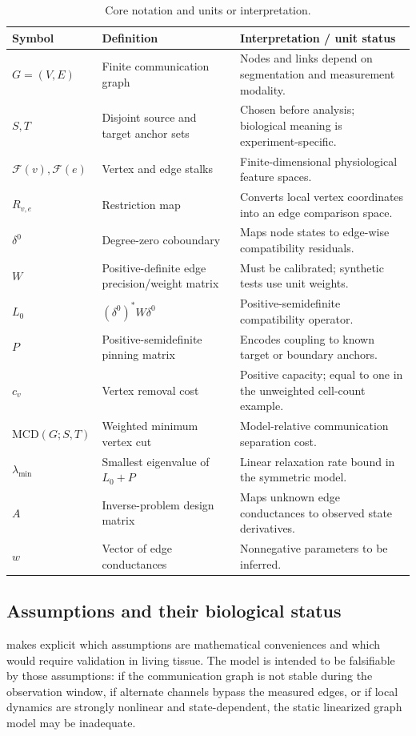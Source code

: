 \documentclass[12pt,a4paper]{article}
\newcommand{\MCD}{\mathrm{MCD}}
\newcommand{\F}{\mathcal{F}}
\begin{document}
\begin{table}[H]
\centering\small
\caption{Core notation and units or interpretation.}
\begin{tabularx}{\textwidth}{p{}p{}X}
\toprule
Symbol & Definition & Interpretation / unit status\\
\midrule
\(G=(V,E)\) & Finite communication graph & Nodes and links depend on segmentation and measurement modality.\\
\(S,T\) & Disjoint source and target anchor sets & Chosen before analysis; biological meaning is experiment-specific.\\
\(\F(v),\F(e)\) & Vertex and edge stalks & Finite-dimensional physiological feature spaces.\\
\(R_{v,e}\) & Restriction map & Converts local vertex coordinates into an edge comparison space.\\
\(\delta^0\) & Degree-zero coboundary & Maps node states to edge-wise compatibility residuals.\\
\(W\) & Positive-definite edge precision/weight matrix & Must be calibrated; synthetic tests use unit weights.\\
\(L_0\) & \((\delta^0)^*W\delta^0\) & Positive-semidefinite compatibility operator.\\
\(P\) & Positive-semidefinite pinning matrix & Encodes coupling to known target or boundary anchors.\\
\(c_v\) & Vertex removal cost & Positive capacity; equal to one in the unweighted cell-count example.\\
\(\MCD(G;S,T)\) & Weighted minimum vertex cut & Model-relative communication separation cost.\\
\(\lambda_{\min}\) & Smallest eigenvalue of \(L_0+P\) & Linear relaxation rate bound in the symmetric model.\\
\(A\) & Inverse-problem design matrix & Maps unknown edge conductances to observed state derivatives.\\
\(w\) & Vector of edge conductances & Nonnegative parameters to be inferred.\\
\bottomrule
\end{tabularx}
\end{table}

\subsection{Assumptions and their biological status}
 makes explicit which assumptions are mathematical conveniences and which would require validation in living tissue. The model is intended to be falsifiable by those assumptions: if the communication graph is not stable during the observation window, if alternate channels bypass the measured edges, or if local dynamics are strongly nonlinear and state-dependent, the static linearized graph model may be inadequate.
\end{document}
